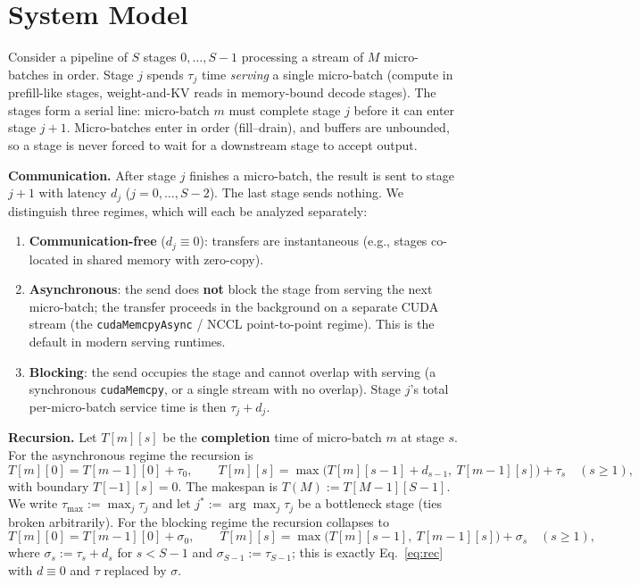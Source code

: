 \documentclass[11pt]{article}
\begin{document}
\section{System Model}\label{sec:model}

Consider a pipeline of $S$ stages $0,\dots,S-1$ processing a stream of $M$ micro-batches in order. Stage $j$ spends $\tau_j$ time \emph{serving} a single micro-batch (compute in prefill-like stages, weight-and-KV reads in memory-bound decode stages). The stages form a serial line: micro-batch $m$ must complete stage $j$ before it can enter stage $j+1$. Micro-batches enter in order (fill--drain), and buffers are unbounded, so a stage is never forced to wait for a downstream stage to accept output.

\textbf{Communication.} After stage $j$ finishes a micro-batch, the result is sent to stage $j+1$ with latency $d_j$ ($j=0,\dots,S-2$). The last stage sends nothing. We distinguish three regimes, which will each be analyzed separately:

\begin{enumerate}
\item \textbf{Communication-free} ($d_j\equiv 0$): transfers are instantaneous (e.g., stages co-located in shared memory with zero-copy).
\item \textbf{Asynchronous}: the send does \textbf{not} block the stage from serving the next micro-batch; the transfer proceeds in the background on a separate CUDA stream (the \texttt{cudaMemcpyAsync} / NCCL point-to-point regime). This is the default in modern serving runtimes.
\item \textbf{Blocking}: the send occupies the stage and cannot overlap with serving (a synchronous \texttt{cudaMemcpy}, or a single stream with no overlap). Stage $j$'s total per-micro-batch service time is then $\tau_j+d_j$.
\end{enumerate}

\textbf{Recursion.} Let $T[m][s]$ be the \textbf{completion} time of micro-batch $m$ at stage $s$. For the asynchronous regime the recursion is
\begin{equation}\label{eq:rec}
T[m][0] = T[m-1][0] + \tau_0,
\qquad
T[m][s] = \max\big(T[m][s-1] + d_{s-1},\ T[m-1][s]\big) + \tau_s \quad (s\ge 1),
\end{equation}
with boundary $T[-1][s]=0$. The makespan is $T(M):=T[M-1][S-1]$. We write $\tau_{\max}:=\max_j\tau_j$ and let $j^*:=\arg\max_j\tau_j$ be a bottleneck stage (ties broken arbitrarily). For the blocking regime the recursion collapses to
\begin{equation}\label{eq:rec-block}
T[m][0] = T[m-1][0] + \sigma_0,
\qquad
T[m][s] = \max\big(T[m][s-1],\ T[m-1][s]\big) + \sigma_s \quad (s\ge 1),
\end{equation}
where $\sigma_s := \tau_s + d_s$ for $s<S-1$ and $\sigma_{S-1}:=\tau_{S-1}$; this is exactly Eq.~\eqref{eq:rec} with $d\equiv0$ and $\tau$ replaced by $\sigma$.
\end{document}
